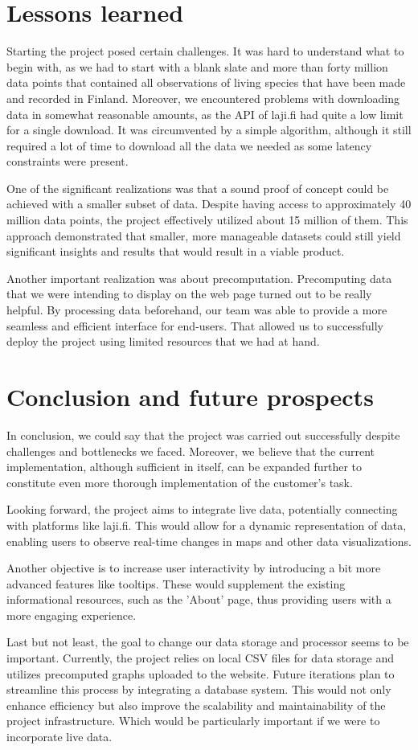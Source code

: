 \documentclass{article}
\begin{document}
\section{Lessons learned}
Starting the project posed certain challenges. It was hard to understand what to begin with, as we had to start with a blank slate and more than forty million data points that contained all observations of living species that have been made and recorded in Finland. Moreover, we encountered problems with downloading data in somewhat reasonable amounts, as the API of laji.fi had quite a low limit for a single download. It was circumvented by a simple algorithm, although it still required a lot of time to download all the data we needed as some latency constraints were present.
\par
One of the significant realizations was that a sound proof of concept could be achieved with a smaller subset of data. Despite having access to approximately 40 million data points, the project effectively utilized about 15 million of them. This approach demonstrated that smaller, more manageable datasets could still yield significant insights and results that would result in a viable product.
\par
Another important realization was about precomputation. Precomputing data that we were intending to display on the web page turned out to be really helpful. By processing data beforehand, our team was able to provide a more seamless and efficient interface for end-users. That allowed us to successfully deploy the project using limited resources that we had at hand.
\section{Conclusion and future prospects}
In conclusion, we could say that the project was carried out successfully despite challenges and bottlenecks we faced. Moreover, we believe that the current implementation, although sufficient in itself, can be expanded further to constitute even more thorough implementation of the customer’s task.
\par
Looking forward, the project aims to integrate live data, potentially connecting with platforms like laji.fi. This would allow for a dynamic representation of data, enabling users to observe real-time changes in maps and other data visualizations.
\par
Another objective is to increase user interactivity by introducing a bit more advanced features like tooltips. These would supplement the existing informational resources, such as the 'About' page, thus providing users with a more engaging experience.
\par
Last but not least, the goal to change our data storage and processor seems to be important. Currently, the project relies on local CSV files for data storage and utilizes precomputed graphs uploaded to the website. Future iterations plan to streamline this process by integrating a database system. This would not only enhance efficiency but also improve the scalability and maintainability of the project infrastructure. Which would be particularly important if we were to incorporate live data.
\end{document}
